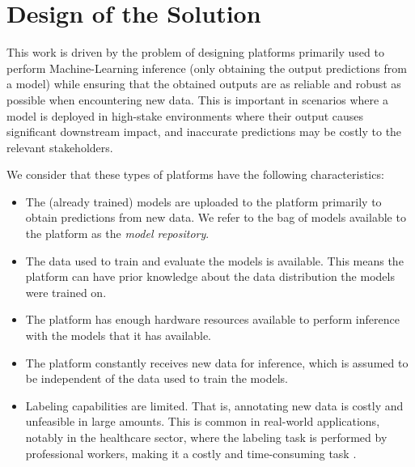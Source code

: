 \documentclass[../main.tex]{subfiles}
\begin{document}
\chapter{Design of the Solution} \label{chap:methodology}
        

    This work is driven by the problem of designing platforms primarily used to perform Machine-Learning inference (only obtaining the output predictions from a model) while ensuring that the obtained outputs are as reliable and robust as possible when encountering new data. This is important in scenarios where a model is deployed in high-stake environments 
    where their output causes significant downstream impact, and inaccurate predictions may be costly to the relevant stakeholders.
    
    We consider that these types of platforms have the following characteristics:

    \begin{itemize}
        \item The (already trained) models are uploaded to the platform primarily to obtain predictions from new data. We refer to the bag of models available to the platform as the \textit{model repository}.
        \item  The data used to train and evaluate the models is available. This means the platform can have prior knowledge about the data distribution the models were trained on.
        \item The platform has enough hardware resources available to perform inference with the models that it has available. 
        \item The platform constantly receives new data for inference, which is assumed to be independent of the data used to train the models.
        \item Labeling capabilities are limited. That is, annotating new data is costly and unfeasible in large amounts.  This is common in real-world applications, notably in the healthcare sector, where the labeling task is performed by professional workers, making it a costly and time-consuming task
        \cite{yakimovich_labels_2021,chen_study_2015, figueroa_predicting_2012}.
    \end{itemize}
\end{document}
